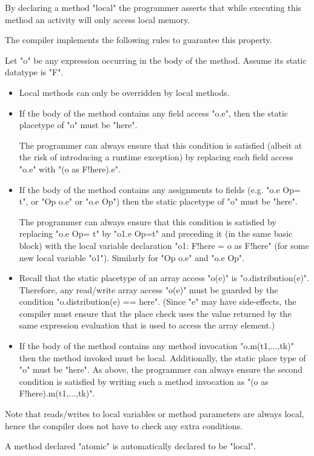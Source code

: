 By declaring a method \xcd"local" the programmer asserts that while
executing this method an activity will only access local memory.

The compiler implements the following rules to guarantee this property.

Let \xcd"o" be any expression occurring in the body of the
method. Assume its static datatype is \xcd"F". 

\begin{itemize}
\item Local methods can only be overridden by local methods. 

\item If the body of the method contains any field access \xcd"o.e", then
the static placetype of \xcd"o" must be \xcd"here". 

The programmer can always ensure that this condition is satisfied
(albeit at the risk of introducing a runtime exception) by replacing
each field access \xcd"o.e" with \xcd"(o as F!here).e".

\item If the body of the method contains any assignments to fields
(e.g. \xcd"o.e Op= t", or \xcd"Op o.e" or \xcd"o.e Op") then the
static placetype of \xcd"o" must be \xcd"here".

The programmer can always ensure that this condition is satisfied by
replacing \xcd"o.e Op= t" by \xcd"o1.e Op=t" and preceding it (in the
same basic block) with the local variable declaration \xcd"o1: F!here = o as F!here" (for some new local variable \xcd"o1"). Similarly for
\xcd"Op o.e" and \xcd"o.e Op".

\item Recall that the static placetype of an array access \xcd"o(e)"
is \xcd"o.distribution(e)". Therefore, any read/write array access
\xcd"o(e)" must be guarded by the condition \xcd"o.distribution(e) == here".  (Since  \xcd"e" may have side-effects, the compiler must
ensure that the place check uses the value returned by the same
expression evaluation that is used to access the array element.)

\item If the body of the method contains any method invocation
\xcd"o.m(t1,...,tk)" then the method invoked must be local. Additionally,
the static place type of \xcd"o" must be \xcd"here". 
As above, the programmer can always ensure the second
condition is satisfied by writing such a method invocation
as \xcd"(o as F!here).m(t1,...,tk)".
\end{itemize}

Note that reads/writes to local variables or method parameters are
always local, hence the compiler does not have to check any extra
conditions.

A method declared \xcd"atomic" is automatically declared
to be \xcd"local".
